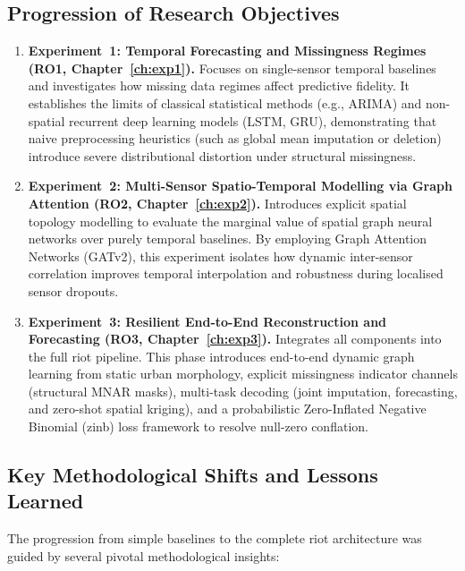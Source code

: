 \subsection{Progression of Research Objectives}
\label{subsec:meth-obj-progression}

\begin{enumerate}
    \item \textbf{Experiment~1: Temporal Forecasting and Missingness Regimes (RO1, Chapter~\ref{ch:exp1}).}
    Focuses on single-sensor temporal baselines and investigates how missing data regimes affect predictive fidelity. It establishes the limits of classical statistical methods (e.g., ARIMA) and non-spatial recurrent deep learning models (LSTM, GRU), demonstrating that naive preprocessing heuristics (such as global mean imputation or deletion) introduce severe distributional distortion under structural missingness.

    \item \textbf{Experiment~2: Multi-Sensor Spatio-Temporal Modelling via Graph Attention (RO2, Chapter~\ref{ch:exp2}).}
    Introduces explicit spatial topology modelling to evaluate the marginal value of spatial graph neural networks over purely temporal baselines. By employing Graph Attention Networks (GATv2), this experiment isolates how dynamic inter-sensor correlation improves temporal interpolation and robustness during localised sensor dropouts.

    \item \textbf{Experiment~3: Resilient End-to-End Reconstruction and Forecasting (RO3, Chapter~\ref{ch:exp3}).}
    Integrates all components into the full \gls{riot} pipeline. This phase introduces end-to-end dynamic graph learning from static urban morphology, explicit missingness indicator channels (structural MNAR masks), multi-task decoding (joint imputation, forecasting, and zero-shot spatial kriging), and a probabilistic Zero-Inflated Negative Binomial (\gls{zinb}) loss framework to resolve null-zero conflation.
\end{enumerate}

\subsection{Key Methodological Shifts and Lessons Learned}
\label{subsec:meth-lessons}

The progression from simple baselines to the complete \gls{riot} architecture was guided by several pivotal methodological insights:

